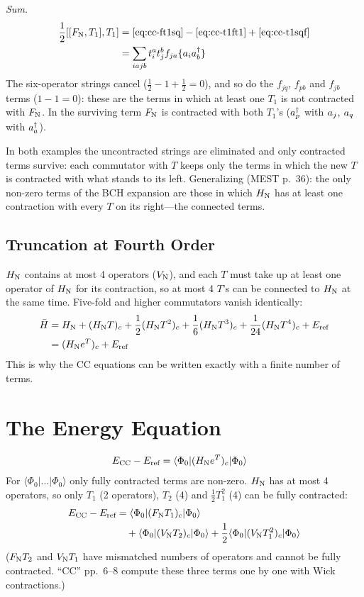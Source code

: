 \emph{Sum.}
\begin{align}
\frac{1}{2} [[F_{\mathrm{N}}, T_1], T_1] &= \eqref{eq:cc-ft1sq} - \eqref{eq:cc-t1ft1} + \eqref{eq:cc-t1sqf} \notag \\
&= \sum_{iajb} t_i^a t_j^b f_{ja} \{a_{i} a^{\dagger}_{b}\} \label{eq:cc-fnt1t1}
\end{align}
The six-operator strings cancel ($\frac{1}{2} - 1 + \frac{1}{2} = 0$), and so do the $f_{jq}$, $f_{pb}$ and $f_{jb}$ terms ($1 - 1 = 0$): these are the terms in which at least one $T_1$ is not contracted with $F_{\mathrm{N}}$. In the surviving term $F_{\mathrm{N}}$ is contracted with both $T_1$'s ($a^{\dagger}_{p}$ with $a_{j}$, $a_{q}$ with $a^{\dagger}_{a}$).

In both examples the uncontracted strings are eliminated and only contracted terms survive: each commutator with $T$ keeps only the terms in which the new $T$ is contracted with what stands to its left. Generalizing (MEST p.~36): the only non-zero terms of the BCH expansion are those in which $H_{\mathrm{N}}$ has at least one contraction with every $T$ on its right---the connected terms.

\subsection{Truncation at Fourth Order}

$H_{\mathrm{N}}$ contains at most 4 operators ($V_{\mathrm{N}}$), and each $T$ must take up at least one operator of $H_{\mathrm{N}}$ for its contraction, so at most 4 $T$'s can be connected to $H_{\mathrm{N}}$ at the same time. Five-fold and higher commutators vanish identically:
\begin{align*}
\bar{H} &= H_{\mathrm{N}}  + (H_{\mathrm{N}}  T)_c + \frac{1}{2} (H_{\mathrm{N}}  T^2)_c + \frac{1}{6} (H_{\mathrm{N}}  T^3)_c + \frac{1}{24} (H_{\mathrm{N}}  T^4)_c + E_{\text{ref}} \\
&= (H_{\mathrm{N}}  e^T)_c + E_{\text{ref}}
\end{align*}
This is why the CC equations can be written exactly with a finite number of terms.

\section{The Energy Equation}

\begin{align*}
E_{\text{CC}} - E_{\text{ref}} &= \langle \Phi_0|(H_{\mathrm{N}}  e^T)_c|\Phi_0\rangle
\end{align*}
For $\langle\Phi_0|\dots|\Phi_0\rangle$ only fully contracted terms are non-zero. $H_{\mathrm{N}}$ has at most 4 operators, so only $T_1$ (2 operators), $T_2$ (4) and $\frac{1}{2} T_1^2$ (4) can be fully contracted:
\begin{align*}
E_{\text{CC}} - E_{\text{ref}} &= \langle \Phi_0|(F_{\mathrm{N}}  T_1)_c|\Phi_0\rangle \\
&\quad + \langle \Phi_0|(V_{\mathrm{N}}  T_2)_c|\Phi_0\rangle + \frac{1}{2} \langle \Phi_0|(V_{\mathrm{N}}  T_1^2)_c|\Phi_0\rangle
\end{align*}
($F_{\mathrm{N}}  T_2$ and $V_{\mathrm{N}}  T_1$ have mismatched numbers of operators and cannot be fully contracted. “CC” pp.~6--8 compute these three terms one by one with Wick contractions.)

